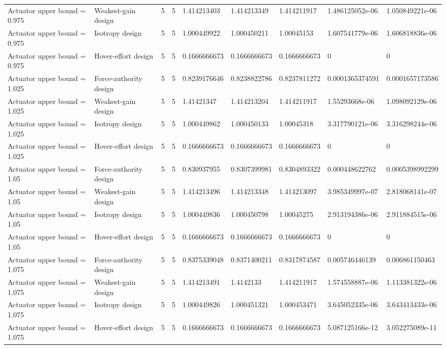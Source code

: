 \begin{tabular}{@{}lllllllll@{}}
Actuator upper bound = 0.975 & Weakest-gain design & 5 & 5 & 1.414213403 & 1.414213349 & 1.414211917 & 1.486125052e-06 & 1.050849221e-06 \\
Actuator upper bound = 0.975 & Isotropy design & 5 & 5 & 1.000449922 & 1.000450211 & 1.00045153 & 1.607541779e-06 & 1.606818836e-06 \\
Actuator upper bound = 0.975 & Hover-effort design & 5 & 5 & 0.1666666673 & 0.1666666673 & 0.1666666673 & 0 & 0 \\
Actuator upper bound = 1.025 & Force-authority design & 5 & 5 & 0.8239176646 & 0.8238822786 & 0.8237811272 & 0.0001365374591 & 0.0001657173586 \\
Actuator upper bound = 1.025 & Weakest-gain design & 5 & 5 & 1.41421347 & 1.414213204 & 1.414211917 & 1.55293668e-06 & 1.098092129e-06 \\
Actuator upper bound = 1.025 & Isotropy design & 5 & 5 & 1.000449862 & 1.000450133 & 1.00045318 & 3.317790121e-06 & 3.316298244e-06 \\
Actuator upper bound = 1.025 & Hover-effort design & 5 & 5 & 0.1666666673 & 0.1666666673 & 0.1666666673 & 0 & 0 \\
Actuator upper bound = 1.05 & Force-authority design & 5 & 5 & 0.830937955 & 0.8307399981 & 0.8304893322 & 0.000448622762 & 0.0005398992299 \\
Actuator upper bound = 1.05 & Weakest-gain design & 5 & 5 & 1.414213496 & 1.414213348 & 1.414213097 & 3.985349997e-07 & 2.818068141e-07 \\
Actuator upper bound = 1.05 & Isotropy design & 5 & 5 & 1.000449836 & 1.000450798 & 1.00045275 & 2.913194386e-06 & 2.911884515e-06 \\
Actuator upper bound = 1.05 & Hover-effort design & 5 & 5 & 0.1666666673 & 0.1666666673 & 0.1666666673 & 0 & 0 \\
Actuator upper bound = 1.075 & Force-authority design & 5 & 5 & 0.8375339048 & 0.8371400211 & 0.8317874587 & 0.005746446139 & 0.006861150463 \\
Actuator upper bound = 1.075 & Weakest-gain design & 5 & 5 & 1.414213491 & 1.4142133 & 1.414211917 & 1.574558887e-06 & 1.113381322e-06 \\
Actuator upper bound = 1.075 & Isotropy design & 5 & 5 & 1.000449826 & 1.000451321 & 1.000453471 & 3.645052335e-06 & 3.643413433e-06 \\
Actuator upper bound = 1.075 & Hover-effort design & 5 & 5 & 0.1666666673 & 0.1666666673 & 0.1666666673 & 5.087125166e-12 & 3.052275089e-11 \\

\end{tabular}
